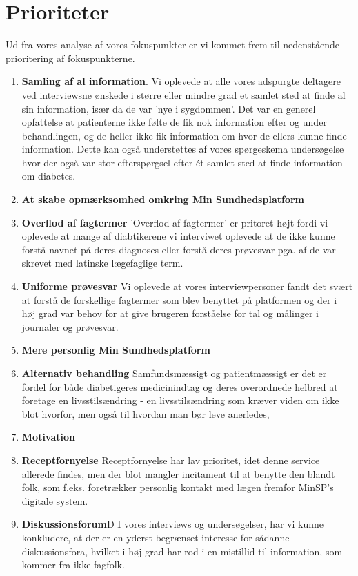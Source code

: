 \section{Prioriteter}
Ud fra vores analyse af vores fokuspunkter er vi kommet frem til nedenstående prioritering af fokuspunkterne.\\
\begin{enumerate}
	\item \textbf{Samling af al information}. Vi oplevede at alle vores adspurgte deltagere ved interviewsne ønskede i større eller mindre grad et samlet sted at finde al sin information, især da de var 'nye i sygdommen'. Det var en generel opfattelse at patienterne ikke følte de fik nok information efter og under behandlingen, og de heller ikke fik information om hvor de ellers kunne finde information. Dette kan også understøttes af vores spørgeskema undersøgelse hvor der også var stor efterspørgsel efter ét samlet sted at finde information om diabetes.
	\item \textbf{At skabe opmærksomhed omkring Min Sundhedsplatform}
	\item \textbf{Overflod af fagtermer}
	'Overflod af fagtermer' er pritoret højt fordi vi oplevede at mange af diabtikerene vi interviwet oplevede at de ikke kunne forstå navnet på deres diagnoses eller forstå deres prøvesvar pga. af de var skrevet med latinske lægefaglige term.
	\item \textbf{Uniforme prøvesvar} Vi oplevede at vores interviewpersoner fandt det svært at forstå de forskellige fagtermer som blev benyttet på platformen og der i høj grad var behov for at give brugeren forståelse for tal og målinger i journaler og prøvesvar.
	\item \textbf{Mere personlig Min Sundhedsplatform}
	\item \textbf{Alternativ behandling} Samfundsmæssigt og patientmæssigt er det er fordel for både diabetigeres medicinindtag og deres overordnede helbred at foretage en livsstilsændring - en livsstilsændring som kræver viden om ikke blot hvorfor, men også til hvordan man bør leve anerledes, 
	\item \textbf{Motivation}
	\item \textbf{Receptfornyelse}
        Receptfornyelse har lav prioritet, idet denne service allerede findes, men der blot mangler incitament til at benytte den blandt folk, som f.eks. foretrækker personlig kontakt med lægen fremfor MinSP's digitale system.
	\item \textbf{Diskussionsforum}D
        I vores interviews og undersøgelser, har vi kunne konkludere, at der er en yderst begrænset interesse for sådanne diskussionsfora, hvilket i høj grad har rod i en mistillid til information, som kommer fra ikke-fagfolk.
\end{enumerate}

